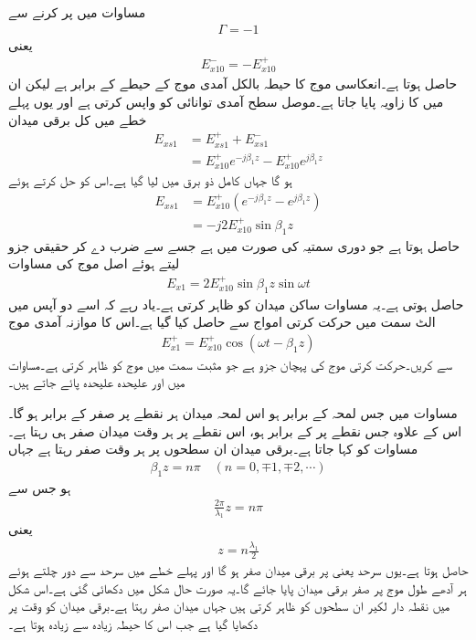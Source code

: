 مساوات  میں  پر کرنے سے
\begin{align*}
\Gamma=-1
\end{align*}
یعنی
\begin{align*}
E_{x10}^-=-E_{x10}^+
\end{align*}
حاصل ہوتا ہے۔انعکاسی موج کا حیطہ بالکل آمدی موج کے حیطے کے برابر ہے لیکن ان میں  کا زاویہ پایا جاتا ہے۔موصل سطح آمدی توانائی کو واپس کرتی ہے اور یوں پہلے خطے میں کل برقی میدان
\begin{align*}
E_{xs1}&=E_{xs1}^+ +E_{xs1}^-\\
&=E_{x10}^+ e^{-j \beta_1 z}-E_{x10}^+ e^{j \beta_1 z}
\end{align*}
ہو گا جہاں کامل ذو برق میں  لیا گیا ہے۔اس کو حل کرتے ہوئے
\begin{align*}
E_{xs1}&=E_{x10}^+ \left(e^{-j \beta_1 z}-e^{j\beta_1 z} \right)\\
&=-j 2 E_{x10}^+ \sin \beta_1 z
\end{align*}
حاصل ہوتا ہے جو دوری سمتیہ کی صورت میں ہے جسے  سے ضرب دے کر حقیقی جزو لیتے ہوئے اصل موج کی مساوات
\begin{align}\label{مساوات_موج_دو_امواج_برابر_ساکن_موج}
E_{x1}=2 E_{x10}^+ \sin \beta_1 z \sin \omega t
\end{align}
حاصل ہوتی ہے۔یہ مساوات ساکن میدان کو ظاہر کرتی ہے۔یاد رہے کہ اسے دو آپس میں الٹ سمت میں حرکت کرتی امواج سے حاصل کیا گیا ہے۔اس کا موازنہ آمدی موج
\begin{align*}
E_{x1}^+=E_{x10}^+ \cos (\omega t - \beta_1 z)
\end{align*}
سے کریں۔حرکت کرتی موج کی پہچان جزو  ہے جو مثبت سمت میں موج کو ظاہر کرتی ہے۔مساوات  میں  اور  علیحدہ علیحدہ پائے جاتے ہیں۔

مساوات  میں جس لمحہ  کے برابر ہو اس لمحہ میدان ہر نقطے پر صفر کے برابر ہو گا۔اس کے علاوہ جس نقطے پر   کے برابر ہو، اس نقطے پر ہر وقت میدان صفر ہی رہتا ہے۔مساوات  کو  کہا جاتا ہے۔برقی میدان ان سطحوں پر ہر وقت صفر رہتا ہے جہاں
\begin{align*}
\beta_1 z = n\pi \quad (n=0,\mp 1, \mp 2, \cdots)
\end{align*}
ہو جس سے
\begin{align*}
\frac{2\pi}{\lambda_1} z =n \pi
\end{align*}
یعنی
\begin{align*}
z=n\frac{\lambda_1}{2}
\end{align*}
حاصل ہوتا ہے۔یوں سرحد یعنی  پر برقی میدان صفر ہو گا اور پہلے خطے میں سرحد سے دور چلتے ہوئے ہر آدھے  طول موج پر صفر برقی میدان پایا جائے گا۔یہ صورت حال شکل  میں دکھائی گئی ہے۔اس شکل میں نقطہ دار لکیر ان سطحوں کو ظاہر کرتی ہیں جہاں میدان صفر رہتا ہے۔برقی میدان کو وقت  پر دکھایا گیا ہے جب اس کا حیطہ زیادہ سے زیادہ ہوتا ہے۔ 

